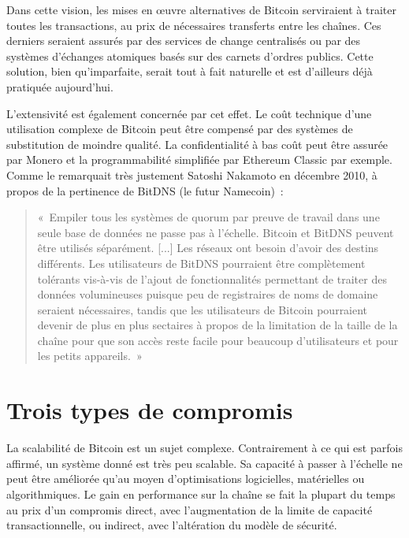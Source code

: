 Dans cette vision, les mises en œuvre alternatives de Bitcoin serviraient à traiter toutes les transactions, au prix de nécessaires transferts entre les chaînes. Ces derniers seraient assurés par des services de change centralisés ou par des systèmes d'échanges atomiques basés sur des carnets d'ordres publics. Cette solution, bien qu'imparfaite, serait tout à fait naturelle et est d'ailleurs déjà pratiquée aujourd'hui.

L'extensivité est également concernée par cet effet. Le coût technique d'une utilisation complexe de Bitcoin peut être compensé par des systèmes de substitution de moindre qualité. La confidentialité à bas coût peut être assurée par Monero et la programmabilité simplifiée par Ethereum Classic par exemple. Comme le remarquait très justement Satoshi Nakamoto en décembre 2010, à propos de la pertinence de BitDNS (le futur Namecoin)~:

\begin{quote}
«~Empiler tous les systèmes de quorum par preuve de travail dans une seule base de données ne passe pas à l'échelle. Bitcoin et BitDNS peuvent être utilisés séparément. [...] Les réseaux ont besoin d'avoir des destins différents. Les utilisateurs de BitDNS pourraient être complètement tolérants vis-à-vis de l'ajout de fonctionnalités permettant de traiter des données volumineuses puisque peu de registraires de noms de domaine seraient nécessaires, tandis que les utilisateurs de Bitcoin pourraient devenir de plus en plus sectaires à propos de la limitation de la taille de la chaîne pour que son accès reste facile pour beaucoup d'utilisateurs et pour les petits appareils.~»
\end{quote}

\section*{Trois types de compromis}

La scalabilité de Bitcoin est un sujet complexe. Contrairement à ce qui est parfois affirmé, un système donné est très peu scalable. Sa capacité à passer à l'échelle ne peut être améliorée qu'au moyen d'optimisations logicielles, matérielles ou algorithmiques. Le gain en performance sur la chaîne se fait la plupart du temps au prix d'un compromis direct, avec l'augmentation de la limite de capacité transactionnelle, ou indirect, avec l'altération du modèle de sécurité.

